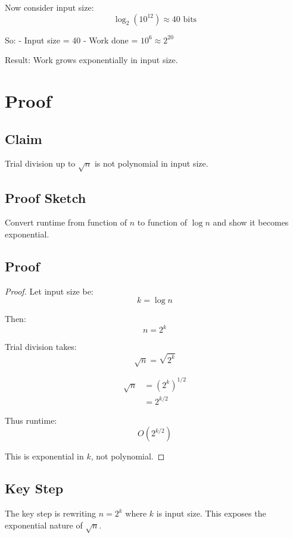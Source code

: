 \documentclass{article}
\begin{document}
Now consider input size:
\[
    \log_2(10^{12}) \approx 40 \text{ bits}
\]

So:
- Input size = 40
- Work done = $10^6 \approx 2^{20}$

Result:
Work grows exponentially in input size.

\section{Proof}

\subsection*{Claim}

Trial division up to $\sqrt{n}$ is not polynomial in input size.

\subsection*{Proof Sketch}

Convert runtime from function of $n$ to function of $\log n$ and show it becomes exponential.

\subsection*{Proof}

\begin{proof}

    Let input size be:
    \[
        k = \log n
    \]

    Then:
    \[
        n = 2^k
    \]

    Trial division takes:
    \[
        \sqrt{n} = \sqrt{2^k}
    \]

    \begin{align*}
        \sqrt{n} & = (2^k)^{1/2} \\
                 & = 2^{k/2}
    \end{align*}

    Thus runtime:
    \[
        O(2^{k/2})
    \]

    This is exponential in $k$, not polynomial.

\end{proof}

\subsection*{Key Step}

The key step is rewriting $n = 2^k$ where $k$ is input size.
This exposes the exponential nature of $\sqrt{n}$.
\end{document}
